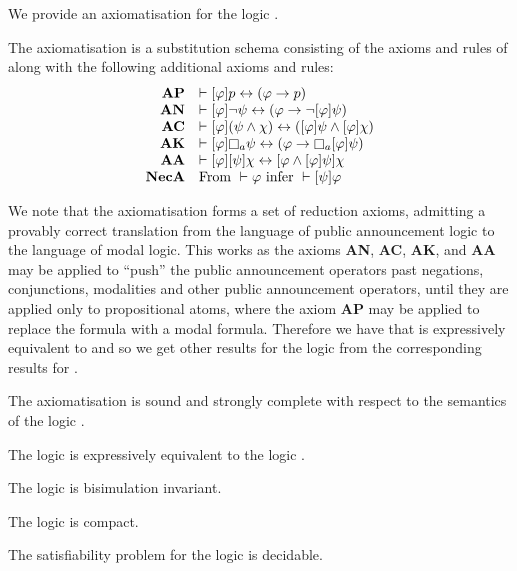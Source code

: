 We provide an axiomatisation for the logic \logicPalS{}.

\begin{definition}
The axiomatisation \axiomPalS{} is a substitution schema consisting of the axioms and rules of \axiomS{} along with the following additional axioms and rules:
$$
\begin{array}{rl}
    {\bf AP} & \proves \announceA{\phi} \atomP \iff (\phi \implies \atomP)\\
    {\bf AN} & \proves \announceA{\phi} \lnot \psi \iff (\phi \implies \lnot \announceA{\phi} \psi)\\
    {\bf AC} & \proves \announceA{\phi} (\psi \land \chi) \iff (\announceA{\phi} \psi \land \announceA{\phi} \chi)\\
    {\bf AK} & \proves \announceA{\phi} \necessaryA \psi \iff (\phi \implies \necessaryA \announceA{\phi} \psi)\\
    {\bf AA} & \proves \announceA{\phi} \announceA{\psi} \chi \iff \announceA{\phi \land \announceA{\phi} \psi} \chi\\
    {\bf NecA} & \text{From } \proves \phi \text{ infer } \proves \announceA{\psi} \phi
\end{array}
$$
\end{definition}

We note that the axiomatisation \axiomPalS{} forms a set of reduction axioms, admitting a provably correct translation from the language \langPal{} of public announcement logic to the language \langMl{} of modal logic.
This works as the axioms {\bf AN}, {\bf AC}, {\bf AK}, and {\bf AA} may be applied to ``push'' the public announcement operators past negations, conjunctions, modalities and other public announcement operators, until they are applied only to propositional atoms, where the axiom {\bf AP} may be applied to replace the formula with a modal formula.
Therefore we have that \logicPalS{} is expressively equivalent to \logicS{} and so we get other results for the logic from the corresponding results for \logicS{}.

\begin{proposition}
The axiomatisation \axiomPalS{} is sound and strongly complete with respect to the semantics of the logic \logicPalS{}.
\end{proposition}

\begin{proposition}
The logic \logicPalS{} is expressively equivalent to the logic \logicS{}.
\end{proposition}

\begin{proposition}
The logic \logicPalS{} is bisimulation invariant.
\end{proposition}

\begin{proposition}
The logic \logicPalS{} is compact.
\end{proposition}

\begin{proposition}
The satisfiability problem for the logic \logicPalS{} is decidable.
\end{proposition}
